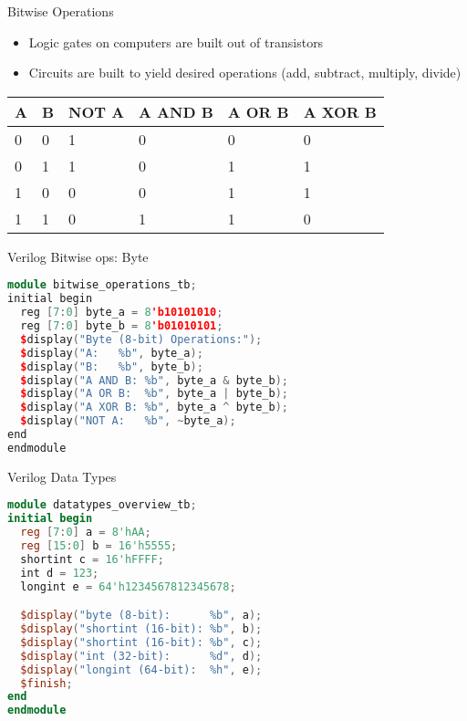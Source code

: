 \begin{withoutheadline}
\begin{frame}[fragile]{Bitwise Operations}
\begin{itemize}
    \item Logic gates on computers are built out of transistors
    \item Circuits are built to yield desired operations (add, subtract, multiply, divide)
\end{itemize}
\begin{tabular}{p{0.75cm}|p{0.75cm}|p{1.5cm}|p{1.5cm}|p{1.5cm}|p{1.5cm}}    \toprule
    A & B & NOT A & A AND B & A OR B & A XOR B \\ \midrule
    0 & 0 &     1 &       0 &      0 &       0 \\ 
    0 & 1 &     1 &       0 &      1 &       1 \\ 
    1 & 0 &     0 &       0 &      1 &       1 \\ 
    1 & 1 &     0 &       1 &      1 &       0 \\ \bottomrule
\end{tabular}
\end{frame}

\begin{frame}[fragile]{Verilog Bitwise ops: Byte}
\begin{lstlisting}[language=c++]
module bitwise_operations_tb;
initial begin
  reg [7:0] byte_a = 8'b10101010;
  reg [7:0] byte_b = 8'b01010101;
  $display("Byte (8-bit) Operations:");
  $display("A:   %b", byte_a);
  $display("B:   %b", byte_b);
  $display("A AND B: %b", byte_a & byte_b);
  $display("A OR B:  %b", byte_a | byte_b);
  $display("A XOR B: %b", byte_a ^ byte_b);
  $display("NOT A:   %b", ~byte_a);
end
endmodule
\end{lstlisting}
\end{frame}

\begin{frame}[fragile]{Verilog Data Types}
\begin{lstlisting}[language=verilog]
module datatypes_overview_tb;
initial begin
  reg [7:0] a = 8'hAA;
  reg [15:0] b = 16'h5555;
  shortint c = 16'hFFFF;
  int d = 123;
  longint e = 64'h1234567812345678;

  $display("byte (8-bit):      %b", a);
  $display("shortint (16-bit): %b", b);
  $display("shortint (16-bit): %b", c);
  $display("int (32-bit):      %d", d);
  $display("longint (64-bit):  %h", e);
  $finish;
end
endmodule
\end{lstlisting}
\end{frame}
    

\end{withoutheadline}
